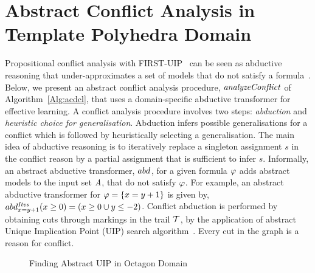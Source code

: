 \section{Abstract Conflict Analysis in Template Polyhedra Domain}\label{sec:conflict}
%
Propositional conflict analysis with FIRST-UIP~\cite{cdcl} can be seen 
as abductive reasoning that under-approximates a 
set of models that do not satisfy a formula~\cite{sas12,dhk2013-popl}.  
Below, we present an abstract conflict analysis procedure, $\mathit{analyzeConflict}$ of 
Algorithm~\ref{Alg:acdcl}, that uses a 
domain-specific abductive transformer for effective learning. 
A conflict analysis procedure involves two steps: {\em abduction} 
and {\em heuristic choice for generalisation}. Abduction infers 
possible generalisations for a conflict which is followed by 
heuristically selecting a generalisation.  The main idea of abductive reasoning is to 
iteratively replace a singleton assignment $s$ in the conflict 
reason by a partial assignment that is sufficient to infer $s$.  
Informally, an abstract abductive transformer, $abd_{}^{}$, 
for a given formula $\varphi$ adds abstract models to the input set
$\mathit{A}$, that do not satisfy $\varphi$. 
%
For example, an abstract abductive transformer for $\varphi=\{x=y+1\}$ 
is given by, $abd_{x=y+1}^{\mathit{Itvs}}(x \geq 0)=(x \geq 0 \cup y \leq -2)$.
%
Conflict abduction is performed by obtaining cuts through markings in the 
trail $\mathcal{T}$, by the application of abstract Unique Implication Point (UIP) 
search algorithm~\cite{uip,cdcl}.  Every cut in the graph is a reason for conflict. 
%
%
\begin{figure}[htbp]
\centering
{}
\caption{\label{conflict-oct} Finding Abstract UIP in Octagon Domain}
\end{figure}  
%
